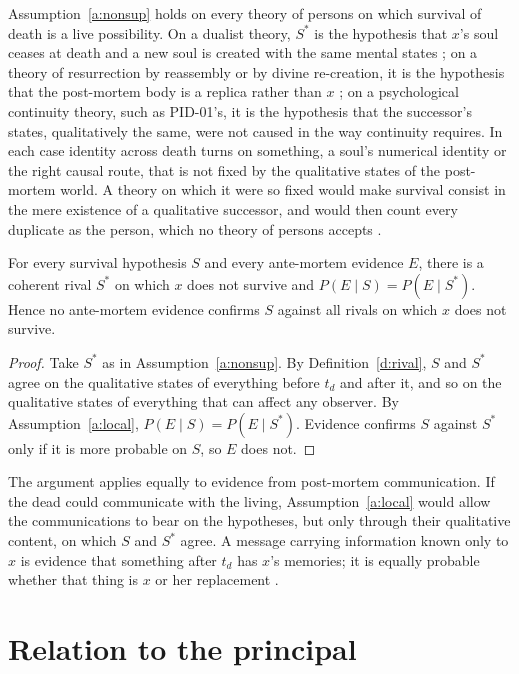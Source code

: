 \documentclass{situationist-preprint}
\begin{document}
Assumption~\ref{a:nonsup} holds on every theory of persons on which survival of death is a live possibility. On a dualist theory, $S^{*}$ is the hypothesis that $x$'s soul ceases at death and a new soul is created with the same mental states \citep{Swinburne1997}; on a theory of resurrection by reassembly or by divine re-creation, it is the hypothesis that the post-mortem body is a replica rather than $x$ \citep{vanInwagen1978,Hick1976}; on a psychological continuity theory, such as PID-01's, it is the hypothesis that the successor's states, qualitatively the same, were not caused in the way continuity requires. In each case identity across death turns on something, a soul's numerical identity or the right causal route, that is not fixed by the qualitative states of the post-mortem world. A theory on which it were so fixed would make survival consist in the mere existence of a qualitative successor, and would then count every duplicate as the person, which no theory of persons accepts \citep{Parfit1984}.

\begin{theorem}\label{t:inacc}
For every survival hypothesis $S$ and every ante-mortem evidence $E$, there is a coherent rival $S^{*}$ on which $x$ does not survive and $P(E \mid S) = P(E \mid S^{*})$. Hence no ante-mortem evidence confirms $S$ against all rivals on which $x$ does not survive.
\end{theorem}

\begin{proof}
Take $S^{*}$ as in Assumption~\ref{a:nonsup}. By Definition~\ref{d:rival}, $S$ and $S^{*}$ agree on the qualitative states of everything before $t_d$ and after it, and so on the qualitative states of everything that can affect any observer. By Assumption~\ref{a:local}, $P(E \mid S) = P(E \mid S^{*})$. Evidence confirms $S$ against $S^{*}$ only if it is more probable on $S$, so $E$ does not.
\end{proof}

The argument applies equally to evidence from post-mortem communication. If the dead could communicate with the living, Assumption~\ref{a:local} would allow the communications to bear on the hypotheses, but only through their qualitative content, on which $S$ and $S^{*}$ agree. A message carrying information known only to $x$ is evidence that something after $t_d$ has $x$'s memories; it is equally probable whether that thing is $x$ or her replacement \citep{Braude2003}.

\section{Relation to the principal}
\end{document}
